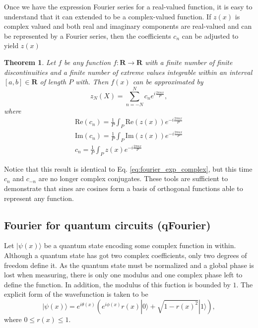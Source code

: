 \documentclass[aps,amssymb,amsmath,amsfonts,pra,superscriptaddress,onecolumn]{revtex4}
\newcommand{\ket}[1]{| #1 \rangle}
\newtheorem{theorem}{Theorem}
\begin{document}
Once we have the expression Fourier series for a real-valued function, it is easy to understand that it can extended to be a complex-valued function. If $z(x)$ is complex valued and both real and imaginary components are real-valued and can be represented by a Fourier series, then the coefficients $c_n$ can be adjusted to yield $z(x)$
\begin{theorem}
Let $f$ be any function $f: \mathbf{R} \rightarrow \mathbf{R}$ with a finite number of finite discontinuities and a finite number of extreme values integrable within an interval $[a, b] \in \mathbf{R}$ of length $P$ with. Then $f(x)$ can be approximated by
\begin{equation}\label{eq:fourier_exp_complex}
    z_N(X) = \sum_{n = -N}^N c_n e^{i \frac{2\pi n x}{P}},
\end{equation}
where
\begin{eqnarray}
    \mathrm{Re}(c_n) = \frac{1}{P} \int_P \mathrm{Re}(z(x)) e^{-i\frac{2\pi n x}{P}} \\
    \mathrm{Im}(c_n) = \frac{1}{P} \int_P \mathrm{Im}(z(x)) e^{-i\frac{2\pi n x}{P}} \\
    c_n = \frac{1}{P} \int_P z(x) e^{-i\frac{2\pi n x}{P}}
\end{eqnarray}
\end{theorem}

Notice that this result is identical to Eq. \eqref{eq:fourier_exp_complex}, but this time $c_n$ and $c_{-n}$ are no longer complex conjugates.
These tools are sufficient to demonstrate that sines are cosines form a basis of orthogonal functions able to represent any function. 

\subsection{Fourier for quantum circuits (qFourier)}
Let $\ket{\psi(x)}$ be a quantum state encoding some complex function in within. Although a quantum state has got two complex coefficients, only two degrees of freedom define it. As the quantum state must be normalized and a global phase is lost when measuring, there is only one modulus and one complex phase left to define the function. In addition, the modulus of this fuction is bounded by $1$. The explicit form of the wavefunction is taken to be
\begin{equation}
\ket{\psi(x)} = e^{i\theta(x)} \left( e^{i\phi(x)} r(x) \ket 0 + \sqrt{1 - r(x)^2} \ket 1\right) ,
\end{equation}
where $0 \leq r(x) \leq 1$.
\end{document}
